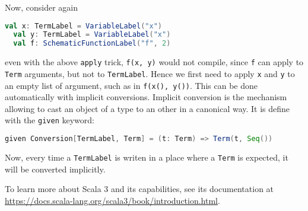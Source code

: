 Now, consider again
\begin{lstlisting}[language=Scala]
  val x: TermLabel = VariableLabel("x")
  val y: TermLabel = VariableLabel("x")
  val f: SchematicFunctionLabel("f", 2)
\end{lstlisting}
even with the above \lstinline|apply| trick, \lstinline|f(x, y)| would not compile, since \lstinline|f| can apply to \lstinline|Term| arguments, but not to \lstinline|TermLabel|. Hence we first need to apply \lstinline|x| and \lstinline|y| to an empty list of argument, such as in \lstinline|f(x(), y())|.
This can be done automatically with implicit conversions. Implicit conversion is the mechanism allowing to cast an object of a type to an other in a canonical way. It is define with the \lstinline|given| keyword:
%
\begin{lstlisting}[language=Scala]
  given Conversion[TermLabel, Term] = (t: Term) => Term(t, Seq())
\end{lstlisting}
%
Now, every time a \lstinline|TermLabel| is writen in a place where a \lstinline|Term| is expected, it will be converted implicitly.

To learn more about Scala 3 and its capabilities, see its documentation at {\footnotesize\url{https://docs.scala-lang.org/scala3/book/introduction.html}}. 

